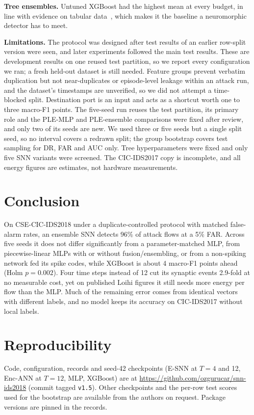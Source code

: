 \documentclass[conference]{IEEEtran}
\begin{document}
\textbf{Tree ensembles.} Untuned XGBoost had the highest mean at every budget, in line with evidence on tabular data~\cite{grinsztajn2022,shwartzziv2022}, which makes it the baseline a neuromorphic detector has to meet.

\textbf{Limitations.} The protocol was designed after test results of an earlier row-split version were seen, and later experiments followed the main test results. These are development results on one reused test partition, so we report every configuration we ran; a fresh held-out dataset is still needed. Feature groups prevent verbatim duplication but not near-duplicates or episode-level leakage within an attack run, and the dataset's timestamps are unverified, so we did not attempt a time-blocked split. Destination port is an input and acts as a shortcut worth one to three macro-F1 points. The five-seed run reuses the test partition, its primary role and the PLE-MLP and PLE-ensemble comparisons were fixed after review, and only two of its seeds are new. We used three or five seeds but a single split seed, so no interval covers a redrawn split; the group bootstrap covers test sampling for DR, FAR and AUC only. Tree hyperparameters were fixed and only five SNN variants were screened. The CIC-IDS2017 copy is incomplete, and all energy figures are estimates, not hardware measurements.

\section{Conclusion}

On CSE-CIC-IDS2018 under a duplicate-controlled protocol with matched false-alarm rates, an ensemble SNN detects 96\% of attack flows at a 5\% FAR. Across five seeds it does not differ significantly from a parameter-matched MLP, from piecewise-linear MLPs with or without fusion/ensembling, or from a non-spiking network fed its spike codes, while XGBoost is about 4 macro-F1 points ahead (Holm $p = 0.002$). Four time steps instead of 12 cut its synaptic events 2.9-fold at no measurable cost, yet on published Loihi figures it still needs more energy per flow than the MLP. Much of the remaining error comes from identical vectors with different labels, and no model keeps its accuracy on CIC-IDS2017 without local labels.

\section*{Reproducibility}

Code, configuration, records and seed-42 checkpoints (E-SNN at $T{=}4$ and 12, Enc-ANN at $T{=}12$, MLP, XGBoost) are at \url{https://github.com/ozgurucar/snn-ids2018} (commit tagged \texttt{v1.5}). Other checkpoints and the per-row test scores used for the bootstrap are available from the authors on request. Package versions are pinned in the records.



\end{document}
